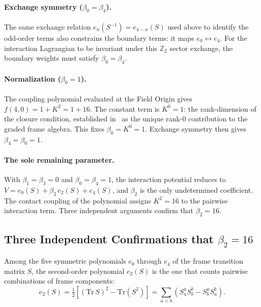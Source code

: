 \documentclass[a4paper,11pt]{article}
\begin{document}
\paragraph{Exchange symmetry ($\beta_0 = \beta_4$).}
The same exchange relation $e_n(S^{-1}) = e_{4-n}(S)$
used above to identify the odd-order terms also constrains
the boundary terms: it maps $e_0 \leftrightarrow e_4$.
For the interaction Lagrangian to be invariant under this
$\mathbb{Z}_2$ sector exchange, the boundary weights must
satisfy $\beta_0 = \beta_4$.

\paragraph{Normalization ($\beta_0 = 1$).}
The coupling polynomial evaluated at the Field Origin
gives $f(4,0) = 1 + K^2 = 1 + 16$. The constant term
is $K^0 = 1$: the rank-dimension of the closure
condition, established in~\cite{Nelson2026a} as the
unique rank-0 contribution to the graded frame algebra.
This fixes $\beta_0 = K^0 = 1$. Exchange symmetry then
gives $\beta_4 = \beta_0 = 1$.

\paragraph{The sole remaining parameter.}
With $\beta_1 = \beta_3 = 0$ and $\beta_0 = \beta_4 = 1$,
the interaction potential reduces to
$V = e_0(S) + \beta_2\,e_2(S) + e_4(S)$, and $\beta_2$ is
the only undetermined coefficient. The contact coupling of
the polynomial assigns $K^2 = 16$ to the pairwise
interaction term. Three independent arguments confirm that
$\beta_2 = 16$.


\subsection{Three Independent Confirmations that $\beta_2 = 16$}

Among the five symmetric polynomials $e_0$ through $e_4$
of the frame transition matrix $S$, the second-order
polynomial $e_2(S)$ is the one that counts pairwise
combinations of frame components:
\begin{equation}
  e_2(S) = \tfrac{1}{2}\left[(\mathrm{Tr}\,S)^2
  - \mathrm{Tr}(S^2)\right]
  = \sum_{a<b}\!\left(S^a_a S^b_b - S^a_b S^b_a\right).
\end{equation}
\end{document}

